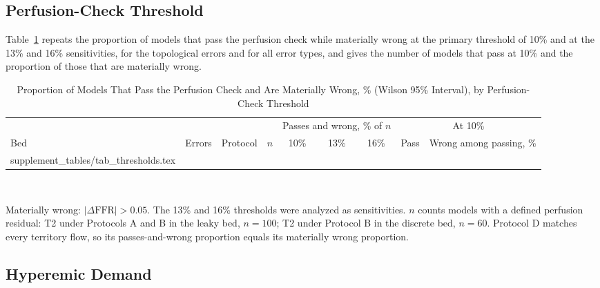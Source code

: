 \documentclass[journal,twoside,web,onecolumn]{ieeecolor}
\begin{document}
\subsection{Perfusion-Check Threshold}
Table~\ref{tab:thr} repeats the proportion of models that pass the perfusion check while materially wrong at the
primary threshold of 10\% and at the 13\% and 16\% sensitivities, for the topological errors and for all error
types, and gives the number of models that pass at 10\% and the proportion of those that are materially wrong.
\begin{table}[!ht]
\caption{Proportion of Models That Pass the Perfusion Check and Are Materially Wrong, \% (Wilson 95\% Interval), by
Perfusion-Check Threshold}\label{tab:thr}
\centering\small
\begin{tabular}{@{}lllrcccrc@{}}
\toprule
 & & & & \multicolumn{3}{c}{Passes and wrong, \% of $n$} & \multicolumn{2}{c}{At 10\%}\\
\cmidrule(lr){5-7}\cmidrule(l){8-9}
Bed & Errors & Protocol & $n$ & 10\% & 13\% & 16\% & Pass & Wrong among passing, \%\\
\midrule
{} supplement_tables/tab_thresholds.tex 
\bottomrule
\end{tabular}
\\[3pt]
\parbox{0.85\textwidth}{\footnotesize Materially wrong: $|\Delta\mathrm{FFR}| > 0.05$. The 13\% and 16\% thresholds were analyzed as sensitivities. $n$ counts models with a
defined perfusion residual: T2 under Protocols A and B in the leaky bed, $n = 100$; T2 under Protocol B in the
discrete bed, $n = 60$. Protocol D matches every territory flow, so its passes-and-wrong proportion equals its
materially wrong proportion.}
\end{table}

\FloatBarrier
\subsection{Hyperemic Demand}\label{sec:demand}


\FloatBarrier
\end{document}

